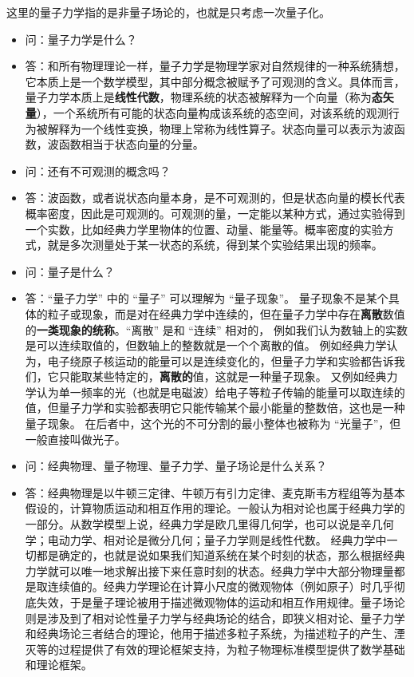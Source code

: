 
\begin{issues}
\issueDraft
\end{issues}

这里的量子力学指的是非量子场论的，也就是只考虑一次量子化。

\begin{itemize}
\item 问：量子力学是什么？
\item 答：和所有物理理论一样，量子力学是物理学家对自然规律的一种系统猜想，它本质上是一个数学模型，其中部分概念被赋予了可观测的含义。具体而言，量子力学本质上是\textbf{线性代数}，物理系统的状态被解释为一个向量（称为\textbf{态矢量}），一个系统所有可能的状态向量构成该系统的态空间，对该系统的观测行为被解释为一个线性变换，物理上常称为线性算子。状态向量可以表示为波函数，波函数相当于状态向量的分量。
\item 问：还有不可观测的概念吗？
\item 答：波函数，或者说状态向量本身，是不可观测的，但是状态向量的模长代表概率密度，因此是可观测的。可观测的量，一定能以某种方式，通过实验得到一个实数，比如经典力学里物体的位置、动量、能量等。概率密度的实验方式，就是多次测量处于某一状态的系统，得到某个实验结果出现的频率。
\item  问：量子是什么？
\item 答：“量子力学” 中的 “量子” 可以理解为 “量子现象”。 量子现象不是某个具体的粒子或现象，而是对在经典力学中连续的，但在量子力学中存在\textbf{离散}数值的\textbf{一类现象的统称}。“离散” 是和 “连续” 相对的， 例如我们认为数轴上的实数是可以连续取值的，但数轴上的整数就是一个个离散的值。 例如经典力学认为，电子绕原子核运动的能量可以是连续变化的，但量子力学和实验都告诉我们，它只能取某些特定的，\textbf{离散的}值，这就是一种量子现象。 又例如经典力学认为单一频率的光（也就是电磁波）给电子等粒子传输的能量可以取连续的值，但量子力学和实验都表明它只能传输某个最小能量的整数倍，这也是一种量子现象。 在后者中，这个光的不可分割的最小整体也被称为 “光量子”，但一般直接叫做光子。
\item 问：经典物理、量子物理、量子力学、量子场论是什么关系？
\item 答：经典物理是以牛顿三定律、牛顿万有引力定律、麦克斯韦方程组等为基本假设的，计算物质运动和相互作用的理论。一般认为相对论也属于经典力学的一部分。从数学模型上说，经典力学是欧几里得几何学，也可以说是辛几何学；电动力学、相对论是微分几何；量子力学则是线性代数。 经典力学中一切都是确定的，也就是说如果我们知道系统在某个时刻的状态，那么根据经典力学就可以唯一地求解出接下来任意时刻的状态。经典力学中大部分物理量都是取连续值的。经典力学理论在计算小尺度的微观物体（例如原子）时几乎彻底失效，于是量子理论被用于描述微观物体的运动和相互作用规律。量子场论则是涉及到了相对论性量子力学与经典场论的结合，即狭义相对论、量子力学和经典场论三者结合的理论，他用于描述多粒子系统，为描述粒子的产生、湮灭等的过程提供了有效的理论框架支持，为粒子物理标准模型提供了数学基础和理论框架。

\end{itemize}
